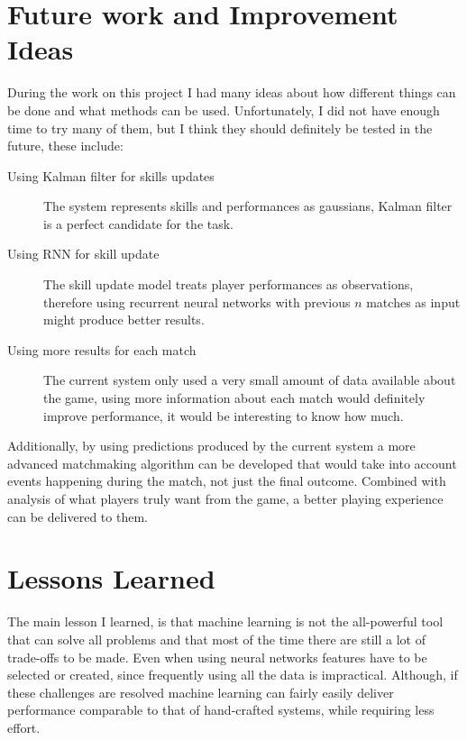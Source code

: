 \documentclass[12pt,a4paper]{book}
\begin{document}
\section{Future work and Improvement Ideas}
During the work on this project I had many ideas about how different things can be done and what methods can be used.
Unfortunately, I did not have enough time to try many of them, but I think they should definitely be tested in the future, these include:
\begin{description}
\item[Using Kalman filter for skills updates]
The system represents skills and performances as gaussians, Kalman filter is a perfect candidate for the task.

\item[Using RNN for skill update]
The skill update model treats player performances as observations, therefore using recurrent neural networks with previous $n$ matches as input might produce better results.

\item[Using more results for each match]
The current system only used a very small amount of data available about the game, using more information about each match would definitely improve performance, it would be interesting to know how much.
\end{description}

Additionally, by using predictions produced by the current system a more advanced matchmaking algorithm can be developed that would take into account events happening during the match, not just the final outcome.
Combined with analysis of what players truly want from the game, a better playing experience can be delivered to them.
\section{Lessons Learned}
The main lesson I learned, is that machine learning is not the all-powerful tool that can solve all problems and that most of the time there are still a lot of trade-offs to be made.
Even when using neural networks features have to be selected or created, since frequently using all the data is impractical.
Although, if these challenges are resolved machine learning can fairly easily deliver performance comparable to that of hand-crafted systems, while requiring less effort.

\printbibliography[heading=bibintoc,title={Bibliography}]

\appendix
\end{document}
